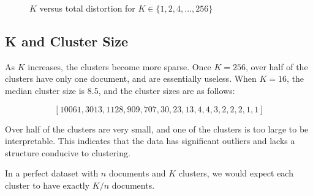 \documentclass{article} %
\begin{document}
\begin{figure}[h]
\begin{center}
\end{center}
\caption{$K$ versus total distortion for $K \in \{1,2,4,...,256\}$}
\end{figure}

\subsection{K and Cluster Size}

As $K$ increases, the clusters become more sparse. Once $K=256$, over half of the clusters have only one document, and are essentially useless. When $K=16$, the median cluster size is 8.5, and the cluster sizes are as follows:

$$[10061, 3013, 1128, 909, 707, 30, 23, 13, 4, 4, 3, 2, 2, 2, 1, 1]$$

Over half of the clusters are very small, and one of the clusters is too large to be interpretable. This indicates that the data has significant outliers and lacks a structure conducive to clustering.








In a perfect dataset with $n$ documents and $K$ clusters, we would expect each cluster to have exactly $K/n$ documents.
\end{document}
